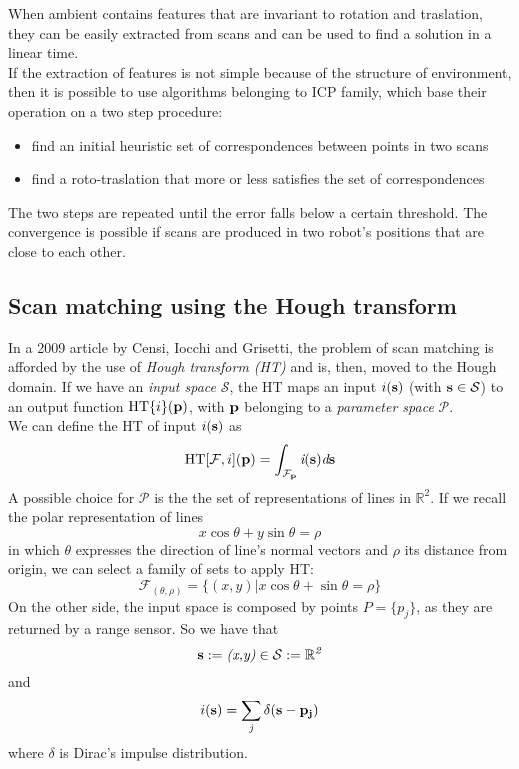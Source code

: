 \documentclass[a4paper, onecolumn]{report}
\begin{document}
When ambient contains features that are invariant to rotation and traslation, they can be easily extracted from scans and can be used to find a solution in a linear time. \\
If the extraction of features is not simple because of the structure of environment, then it is possible to use algorithms belonging to ICP family, which base their operation on a two step procedure:
\begin{itemize}
	\item{find an initial heuristic set of correspondences between points in two scans}
	\item{find a roto-traslation that more or less satisfies the set of correspondences}
\end{itemize}
The two steps are repeated until the error falls below a certain threshold. The convergence is possible if scans are produced in two robot's positions that are close to each other.

\subsection{Scan matching using the Hough transform}
In a 2009 article by Censi, Iocchi and Grisetti, the problem of scan matching is afforded by the use of \emph{Hough transform (HT)} and is, then, moved to the Hough domain. If we have an \emph{input space} $\mathcal{S}$, the HT maps an input $i(\bf{s})$ (with $\bf{s} \in \mathcal{S}$) to an output function $\mbox{HT}\{i\}(\bf{p})$, with $\bf{p}$ belonging to a \emph{parameter space} $\mathcal{P}$. \\
We can define the HT of input $i(\bf{s})$ as
\begin{equation}
	\mbox{HT}[\mathcal{F}, i](\bf{p}) = \int_{\mathcal{F}_{\bf{p}}} \emph{i}(\bf{s}) \emph{d}\bf{s}
\end{equation}
A possible choice for $\mathcal{P}$ is the the set of representations of lines in $\mathbb{R}^2$. If we recall the polar representation of lines 
\begin{equation}
	x\cos\theta + y\sin\theta = \rho
\end{equation}
in which $\theta$ expresses the direction of line's normal vectors and $\rho$ its distance from origin, we can select a family of sets to apply HT:
\begin{equation}
	\mathcal{F}_{(\theta, \rho)} =\{(x,y) | x\cos\theta + \sin\theta = \rho\}
\end{equation}
On the other side, the input space is composed by points $P = \{p_j\}$, as they are returned by a range sensor. So we have that
\begin{equation}
	\bf{s} := \emph{(x,y)} \in \mathcal{S} := \mathbb{R}^\emph{2}
\end{equation}
and
\begin{equation}
	i(\bf{s}) = \sum_{\emph{j}} \delta(\bf{s} - \bf{p_j})
\end{equation}
where $\delta$ is Dirac's impulse distribution.
\end{document}
